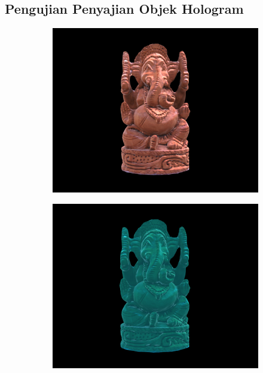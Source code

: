 \documentclass[conference]{IEEEtran}
\begin{document}
	\subsection{Pengujian Penyajian Objek Hologram} 
		\vspace{-2ex}
		\begin{figure} [h]
			\begin{center}
				\begin{subfigure}[t]{0.11\textwidth}
					\includegraphics[width=\textwidth]{img/ilusi1.png}
					\caption{\label{fig:ilusi1}}
				\end{subfigure}
				\hspace{0.05em}
				\begin{subfigure}[t]{0.11\textwidth}
					\includegraphics[width=\textwidth]{img/ilusi2.png}

\end{subfigure}
\end{center}
\end{figure}
\end{document}

